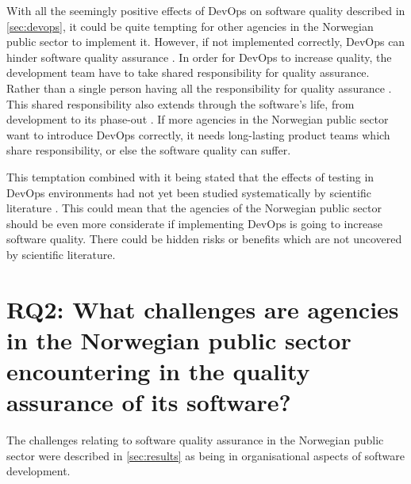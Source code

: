 With all the seemingly positive effects of DevOps on software quality described in \autoref{sec:devops}, it could be quite tempting for other agencies in the Norwegian public sector to implement it. However, if not implemented correctly, DevOps can hinder software quality assurance \cite{dsc_2019}. In order for DevOps to increase quality, the development team have to take shared responsibility for quality assurance. Rather than a single person having all the responsibility for quality assurance \cite{dsc_2019}. This shared responsibility also extends through the software's life, from development to its phase-out \cite{dsc_2019}. If more agencies in the Norwegian public sector want to introduce DevOps correctly, it needs long-lasting product teams which share responsibility, or else the software quality can suffer.


This temptation combined with it being stated that the effects of testing in DevOps environments had not yet been studied systematically by scientific literature \cite{dsc_2019}\cite{ja_2016}. This could mean that the agencies of the Norwegian public sector should be even more considerate if implementing DevOps is going to increase software quality. There could be hidden risks or benefits which are not uncovered by scientific literature.

\newpage

\section{RQ2: What challenges are agencies in the Norwegian public sector encountering in the quality assurance of its software?}
The challenges relating to software quality assurance in the Norwegian public sector were described in \autoref{sec:results} as being in organisational aspects of software development.


